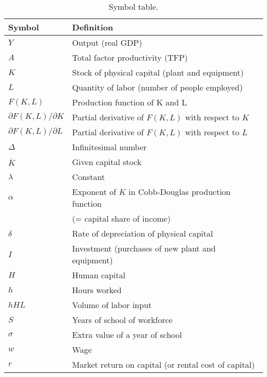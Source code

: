 \begin{table}[H]
\centering
\caption{Symbol table.}
\begin{tabular*}{0.98\textwidth}{l@{\extracolsep{\fill}}l}
\toprule
Symbol & Definition\\
\midrule
$Y$                            &Output (real GDP)\\
$A$                            &Total factor productivity (TFP)\\
$K$                            &Stock of physical capital (plant and equipment)\\
$L$                            &Quantity of labor (number of people employed)\\
$F(K,L)$                    &Production function of K and L\\
$\partial F(K,L)/\partial K $             &    Partial derivative of $F(K,L)$ with respect to $K$\\
$\partial F(K,L)/\partial L $             &    Partial derivative of $F(K,L)$ with respect to $L$\\
$\Delta$                     &Infinitesimal number\\
$\overline{K}$                &Given capital stock\\
$\lambda$                     &Constant\\
$\alpha$                     &Exponent of $K$ in Cobb-Douglas production function \\
                            &(= capital share of income)\\
$\delta$                     &Rate of depreciation of physical capital\\
$I$                            &Investment (purchases of new plant and equipment)\\
$H$                            &Human capital\\
$h$                            &Hours worked\\
$hHL$                        &Volume of labor input\\
$S$                            &Years of school of workforce\\
$\sigma$                     &Extra value of a year    of school\\
$w$                            &Wage\\
$r$                            &Market return on capital (or rental cost of capital)\\
\bottomrule
\end{tabular*}
\end{table}

